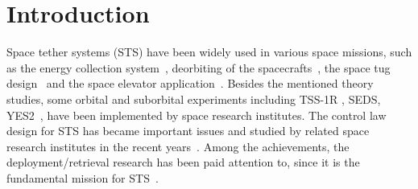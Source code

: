 \documentclass[conference]{IEEEtran}
\theoremstyle{plain}
\begin{document}
\section{Introduction}
Space tether systems (STS) have been widely used in various space missions, such as the energy collection system~\cite{lanoix2005effect}, deorbiting of the spacecrafts~\cite{khan2014analysis}, the space tug design~\cite{wen2016constrained} and the space elevator application~\cite{kojima2015mission}. Besides the mentioned theory studies, some orbital and suborbital experiments including TSS-1R \cite{lanoix2005effect}, SEDS, YES2~\cite{williams2012review}, have been implemented by space research institutes. The control law design for STS has became important issues and studied by related space research institutes in the recent years~\cite{hallaj2015tethered,alary2015dynamics,wang2015coordinated}. Among the achievements, the deployment/retrieval research has been paid attention to, since it is the fundamental mission for STS~\cite{zhu2015dynamic}.\par
\end{document}
